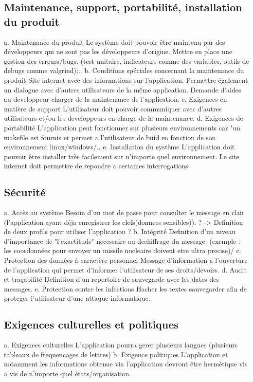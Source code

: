 \documentclass[a4]{article}
\begin{document}
		\subsection{Maintenance, support, portabilité, installation du produit}
			a. Maintenance du produit
Le système doit pouvoir être maintenu par des développeurs qui ne sont pas les
développeurs d’origine.
Mettre en place une gestion des erreurs/bugs. (test unitaire, indicateurs comme des variables, outils de debugs comme valgrind);..
			b. Conditions spéciales concernant la maintenance du produit
Site internet avec des informations sur l'application.
Permettre également un dialogue avec d'autres utilisateurs de la même application.
Demande d'aides au developpeur charger de la maintenance de l'application.
			c. Exigences en matière de support
L'utilisateur doit pouvoir communiquer avec d'autres utilisateurs et/ou les developpeurs en charge de la maintenance.
			d. Exigences de portabilité
L'application peut fonctionner sur plusieurs environnements car "un makefile est fournis et permet a l'utilisateur de buid en fonction de son environnement linux/windows/..
			e. Installation du système
L'application doit pouvoir être installer très facilement sur n'importe quel environnement.
Le site internet doit permettre de repondre a certaines interrogations.
		\subsection{Sécurité}
			a. Accès au système
Besoin d'un mot de passe pour consulter le message en clair (l'application ayant déja enregistrer les clefs(donnees sensibles)). ?
-> Definition de deux profils pour utiliser l'application ?
			b. Intégrité
Definition d'un niveau d'importance de "l'exactitude" necessaire au dechiffrage du message.
(exemple : les coordonnées pour envoyer un missile nucleaire doivent etre ultra precise)/
			c. Protection des données à caractère personnel
Message d'information a l'ouverture de l'application qui permet d'informer l'utilisateur de ses droits/devoirs.
			d. Audit et traçabilité
Definition d'un repertoire de sauvegarde avec les dates des messages.
			e. Protection contre les infections
Hacher les textes sauvegarder afin de proteger l'utilisateur d'une attaque informatique.
		\subsection{Exigences culturelles et politiques}
			a. Exigences culturelles
L'application pourra gerer plusieurs langues (plusieurs tableaux de frequencages de lettres)
			b. Exigence politiques
L'application et notamment les informations obtenue via l'application devront être hermétique vis a vis de n'importe quel états/organisation.
\end{document}
